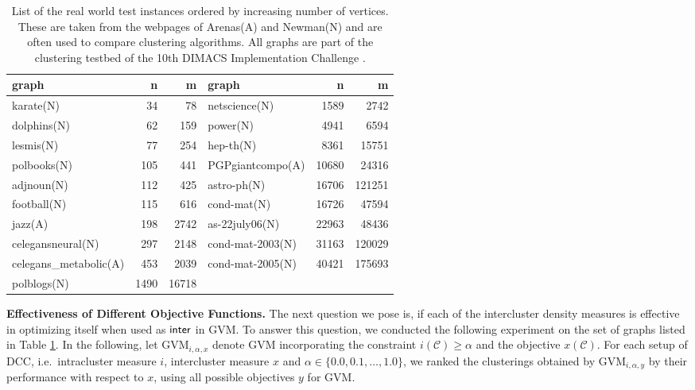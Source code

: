 \documentclass{llncs}
\newcommand{\measure}[1]{\ensuremath{\text{\normalfont{\sffamily {#1}}}}\xspace}
\newcommand{\C}{\ensuremath{\mathcal{C}}}
\newcommand{\andreapar}{\vspace*{.5ex}\par\noindent}
\begin{document}
\begin{footnotesize}
\begin{table}
\footnotesize
    \begin{center}
	\begin{tabular}{|l|r|r||l|r|r|}
	\hline
	graph & n & m & graph & n & m\\
	\hline
	\hline
	karate(N) & 34 & 78 & netscience(N) & 1589 & 2742 \\
    dolphins(N) & 62 & 159 & power(N) & 4941 & 6594 \\
    lesmis(N) & 77 & 254 & hep-th(N) & 8361 & 15751 \\
    polbooks(N) & 105 & 441 & PGPgiantcompo(A) & 10680 & 24316\\
    adjnoun(N) & 112 & 425 & astro-ph(N) & 16706 & 121251\\
    football(N) & 115 & 616 & cond-mat(N) & 16726 & 47594\\
    jazz(A) & 198 & 2742 & as-22july06(N) & 22963 & 48436\\
    celegansneural(N) & 297 & 2148 & cond-mat-2003(N) & 31163 & 120029\\
    celegans\_metabolic(A) & 453 & 2039 & cond-mat-2005(N) & 40421 & 175693\\
    polblogs(N) & 1490 & 16718 &  &  &\\
	\hline
	\end{tabular}
	\end{center}
	\caption{List of the real world test instances ordered by increasing number of vertices. These are taken from the webpages of Arenas(A) \cite{arenasWS} and Newman(N) \cite{newmanWS} and are often used to compare clustering algorithms. All graphs are part of the clustering testbed of the 10th DIMACS Implementation Challenge \cite{dimacsWS}.}
	\label{tab:real_world_graphs}
\end{table}
\end{footnotesize}
\normalsize
\andreapar\textbf{Effectiveness of Different Objective Functions.}
The next question we pose is, if each of the intercluster density measures is effective in optimizing itself when used as \measure{inter} in GVM. To answer this question, we conducted the following experiment on the set of
graphs listed in Table \ref{tab:real_world_graphs}.
In the following, let $\text{GVM}_{i, \alpha, x}$ denote GVM incorporating the constraint $i(\C) \geq \alpha$ and the objective $x(\C)$.
For each setup of DCC, i.e.~intracluster measure $i$, intercluster measure $x$ and $\alpha \in \{0.0, 0.1, \ldots, 1.0\}$, we ranked the clusterings obtained by $\text{GVM}_{i, \alpha, y}$ by their performance with respect to $x$, using all possible objectives $y$ for GVM.
\end{document}
